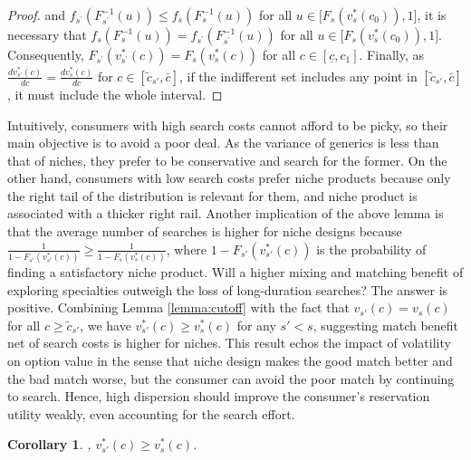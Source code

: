 \documentclass[14pt]{article}
\theoremstyle{plain}
\newtheorem{cor}[thm]{Corollary}
\theoremstyle{definition}
\theoremstyle{remark}
\DeclareRobustCommand\1{\futurelet\oneNext\oneCheck}
\begin{document}
\begin{proof}
and $f_{s^{\prime }}(F_{s^{\prime }}^{-1}(u))\leq f_{s}(F_{s}^{-1}(u))$ for
all $u\in \lbrack F_{s}(v_{s}^{\ast }(c_{0})),1]$, it is necessary that $%
f_{s}(F_{s}^{-1}(u))=f_{s^{\prime }}(F_{s^{\prime }}^{-1}(u))$ for all $u\in
\lbrack F_{s}(v_{s}^{\ast }(c_{0})),1]$. Consequently, $F_{s^{\prime
}}(v_{s^{\prime }}^{\ast }(c))=F_{s}(v_{s}^{\ast }(c))$ for all $c\in \left[
\underline{c}, c_{1}\right] $. Finally, as $\frac{dv_{s'}^{\ast }(c)}{dc}=\frac{dv_{s}^{\ast }(c)}{dc}$ for $c\in[\tilde{c}_{s'}, \bar{c}]$, if the indifferent set includes any point in $[\tilde{c}_{s'},\bar{c}]$, it must include the whole interval.

\end{proof}

Intuitively, consumers with high search costs cannot afford to be picky, so their main objective is to avoid a poor deal. As the variance of generics is less than that of niches, they prefer to be conservative and search for the former. On the other hand, consumers with low search costs prefer niche products because only the right tail of the distribution is relevant for them, and niche product is associated with a thicker right rail. Another implication of the above lemma is that the average number of searches is higher for niche designs because $\frac{1}{1-F_{s'}(v_{s'}^*(c))}\geq \frac{1}{1-F_s(v_s^*(c))}$, where $1-F_{s'}(v_{s'}^*(c))$ is the probability of finding a satisfactory niche product. Will a higher mixing and matching benefit of exploring specialties outweigh the loss of long-duration searches? The answer is positive. Combining Lemma \ref{lemma:cutoff} with the fact that $v_{s'}(c)=v_{s}(c)$ for all $c\geq\tilde{c}_{s'}$, we have $v_{s'}^*(c)\geq v_s^*(c)$ for any $s'<s$, suggesting match benefit net of search costs is higher for niches. This result echos the impact of volatility on option value in the sense that niche design makes the good match better and the bad match worse, but the consumer can avoid the poor match by continuing to search. Hence, high dispersion should improve the consumer's reservation utility weakly, even accounting for the search effort.

\begin{cor}\label{cor:mixing_and_matching_benefit}
, $v_{s'}^*(c)\geq v_s^*(c)$.
\end{cor}
\end{document}

